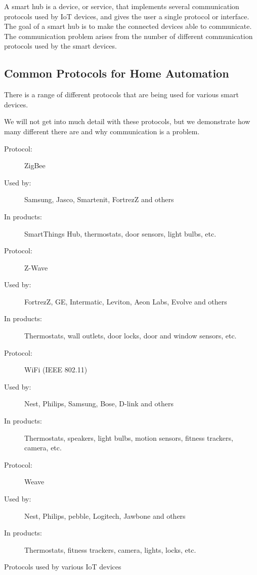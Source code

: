 A smart hub is a device, or service, that implements several communication protocols used by IoT devices, 
and gives the user a single protocol or interface. 
The goal of a smart hub is to make the connected devices able to communicate.
The communication problem arises from the number of different communication protocols used by the smart devices. 


\subsection{Common Protocols for Home Automation}
There is a range of different protocols that are being used for various smart devices. 

We will not get into much detail with these protocols, 
but we demonstrate how many different there are and why communication is a problem.
\begin{table}
   \begin{description}
       \item[Protocol:] ZigBee
       \item[Used by:] Samsung, Jasco, Smartenit, FortrezZ and others
       \item[In products:] SmartThings Hub, thermostats, door sensors, light bulbs, etc.\\
       
       \item[Protocol:] Z-Wave
       \item[Used by:] FortrezZ, GE, Intermatic, Leviton, Aeon Labs, Evolve and others
       \item[In products:] Thermostats, wall outlets, door locks, door and window sensors, etc.  \\
       
       \item[Protocol:] WiFi (IEEE 802.11)
       \item[Used by:] Nest, Philips, Samsung, Bose, D-link and others
       \item[In products:] Thermostats, speakers, light bulbs, motion sensors, fitness trackers, camera, etc. 
       
       \item[Protocol:] Weave
       \item[Used by:] Nest, Philips, pebble, Logitech, Jawbone and others
       \item[In products:] Thermostats, fitness trackers, camera, lights, locks, etc. 
    \end{description}
    \caption{Protocols used by various IoT devices}\label{table:iotprotocols}
\end{table}

